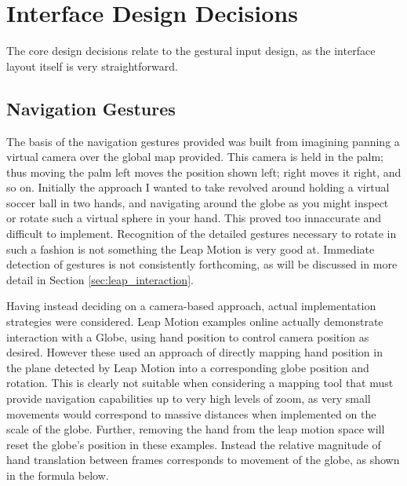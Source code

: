 \documentclass{sigplanconf}
\begin{document}
\section{Interface Design Decisions}
\label{sec:design_decisions}

The core design decisions relate to the gestural input design, as the interface layout itself is very straightforward. 

\subsection{Navigation Gestures}

The basis of the navigation gestures provided was built from imagining panning a virtual camera over the global map provided. This camera is held in the palm; thus moving the palm left moves the position shown left; right moves it right, and so on. Initially the approach I wanted to take revolved around holding a virtual soccer ball in two hands, and navigating around the globe as you might inspect or rotate such a virtual sphere in your hand. This proved too innaccurate and difficult to implement. Recognition of the detailed gestures necessary to rotate in such a fashion is not something the Leap Motion is very good at. Immediate detection of gestures is not consistently forthcoming, as will be discussed in more detail in Section \ref{sec:leap_interaction}.


Having instead deciding on a camera-based approach, actual implementation strategies were considered. Leap Motion examples online actually demonstrate interaction with a Globe, using hand position to control camera position as desired. However these used an approach of directly mapping hand position in the plane detected by Leap Motion into a corresponding globe position and rotation. This is clearly not suitable when considering a mapping tool that must provide navigation capabilities up to very high levels of zoom, as very small movements would correspond to massive distances when implemented on the scale of the globe. Further, removing the hand from the leap motion space will reset the globe's position in these examples. Instead the relative magnitude of hand translation between frames corresponds to movement of the globe, as shown in the formula below.
\end{document}
